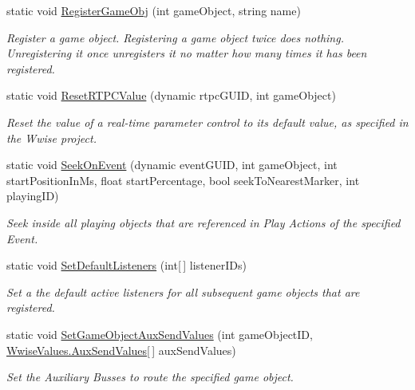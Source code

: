 \begin{DoxyCompactItemize}
static void \mbox{\hyperlink{classak_1_1soundengine_a3fd88cbe63fb08f7e42e55cf5545d0ea}{Register\+Game\+Obj}} (int game\+Object, string name)
\begin{DoxyCompactList}\small\item\em Register a game object. Registering a game object twice does nothing. Unregistering it once unregisters it no matter how many times it has been registered. \end{DoxyCompactList}\item 
static void \mbox{\hyperlink{classak_1_1soundengine_afc2a12c76050e0525a056ec67add7743}{Reset\+R\+T\+P\+C\+Value}} (dynamic rtpc\+G\+U\+ID, int game\+Object)
\begin{DoxyCompactList}\small\item\em Reset the value of a real-\/time parameter control to its default value, as specified in the Wwise project. \end{DoxyCompactList}\item 
static void \mbox{\hyperlink{classak_1_1soundengine_aafaae28ffe765296b126b8b8e9a18d6d}{Seek\+On\+Event}} (dynamic event\+G\+U\+ID, int game\+Object, int start\+Position\+In\+Ms, float start\+Percentage, bool seek\+To\+Nearest\+Marker, int playing\+ID)
\begin{DoxyCompactList}\small\item\em Seek inside all playing objects that are referenced in Play Actions of the specified Event. \end{DoxyCompactList}\item 
static void \mbox{\hyperlink{classak_1_1soundengine_ae46d7ee86793631aa736ecec55614bd6}{Set\+Default\+Listeners}} (int\mbox{[}$\,$\mbox{]} listener\+I\+Ds)
\begin{DoxyCompactList}\small\item\em Set a the default active listeners for all subsequent game objects that are registered. \end{DoxyCompactList}\item 
static void \mbox{\hyperlink{classak_1_1soundengine_aeaf8b01fb0e562ab85f2f2d9528fefdf}{Set\+Game\+Object\+Aux\+Send\+Values}} (int game\+Object\+ID, \mbox{\hyperlink{struct_waapi_c_s_1_1_custom_values_1_1_wwise_values_1_1_aux_send_values}{Wwise\+Values.\+Aux\+Send\+Values}}\mbox{[}$\,$\mbox{]} aux\+Send\+Values)
\begin{DoxyCompactList}\small\item\em Set the Auxiliary Busses to route the specified game object. \end{DoxyCompactList}\item 

\end{DoxyCompactItemize}
